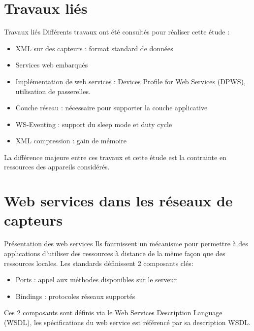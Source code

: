 \section{Travaux liés}
\begin{frame}{Travaux liés}
Différents travaux ont été consultés pour réaliser cette étude :
\begin{itemize}
\item XML sur des capteurs : format standard de données
\item Services web embarqués 
\item Implémentation de web services : Devices Profile for Web Services (DPWS), utilisation de passerelles.
\item Couche réseau : nécessaire pour supporter la couche applicative
\item WS-Eventing : support du sleep mode et duty cycle
\item XML compression : gain de mémoire
\end{itemize}
La différence majeure entre ces travaux et cette étude est la contrainte en ressources des appareils considérés.
\end{frame}
\section{Web services dans les réseaux de capteurs}
\begin{frame}{Présentation des web services}
Ils fournissent un mécanisme pour permettre à des applications d’utiliser des ressources à distance de la même façon que des ressources locales.
Les standards définissent 2 composants clés:
\begin{itemize}
\item Ports : appel aux méthodes disponibles sur le serveur  
\item Bindings : protocoles réseaux supportés
\end{itemize}
Ces 2 composants sont définis via le Web Services Description Language (WSDL), les spécifications du web service est référencé par sa description WSDL.
\end{frame}

